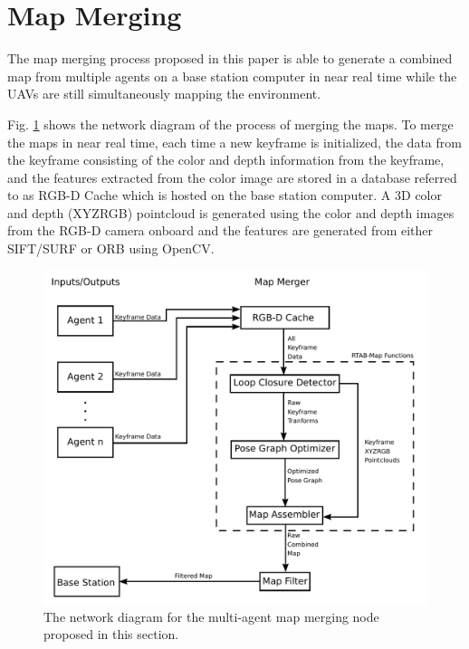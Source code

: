 \documentclass[letterpaper, 10 pt, conference]{ieeeconf}  %
\begin{document}
\section{Map Merging}\label{merge}

The map merging process proposed in this paper is able to generate a combined map from multiple agents on a base station computer in near real time while the UAVs are still simultaneously mapping the environment.

Fig. \ref{fig:map_merge} shows the network diagram of the process of merging the maps. To merge the maps in near real time, each time a new keyframe is initialized, the data from the keyframe consisting of the color and depth information from the keyframe, and the features extracted from the color image are stored in a database referred to as RGB-D Cache which is hosted on the base station computer. A 3D color and depth (XYZRGB) pointcloud is generated using the color and depth images from the RGB-D camera onboard and the features are generated from either SIFT/SURF or ORB using OpenCV.

\begin{figure}
\centering
\includegraphics[width=0.7\linewidth]{map_merger_network}
\caption{The network diagram for the multi-agent map merging node proposed in this section.}
\label{fig:map_merge}
\end{figure}
\end{document}
